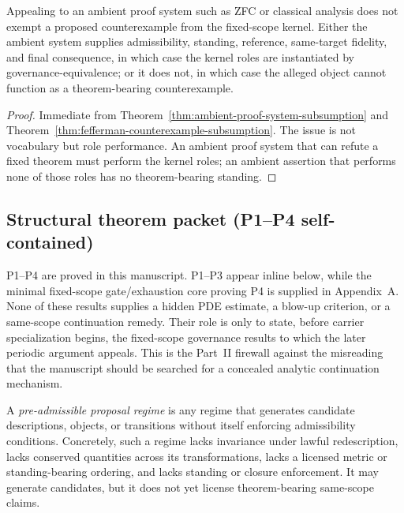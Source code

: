 \begin{manualcorollary}
\label{cor:no-ambient-proof-system-escape}
Appealing to an ambient proof system such as ZFC or classical analysis does not exempt a proposed counterexample from the fixed-scope kernel. Either the ambient system supplies admissibility, standing, reference, same-target fidelity, and final consequence, in which case the kernel roles are instantiated by governance-equivalence; or it does not, in which case the alleged object cannot function as a theorem-bearing counterexample.
\end{manualcorollary}

\begin{proof}
Immediate from Theorem~\ref{thm:ambient-proof-system-subsumption} and Theorem~\ref{thm:fefferman-counterexample-subsumption}. The issue is not vocabulary but role performance. An ambient proof system that can refute a fixed theorem must perform the kernel roles; an ambient assertion that performs none of those roles has no theorem-bearing standing.
\end{proof}

\subsection{Structural theorem packet (P1--P4 self-contained)}

\begin{tcolorbox}[title={What this packet is and is not}, colback=blue!2!white, colframe=blue!55!black]
P1--P4 are proved in this manuscript. P1--P3 appear inline below, while the minimal fixed-scope gate/exhaustion core proving P4 is supplied in Appendix~A. None of these results supplies a hidden PDE estimate, a blow-up criterion, or a same-scope continuation remedy. Their role is only to state, before carrier specialization begins, the fixed-scope governance results to which the later periodic argument appeals. This is the Part~II firewall against the misreading that the manuscript should be searched for a concealed analytic continuation mechanism.
\end{tcolorbox}

\begin{definition}\label{def:preadmissible-proposal-regime}
A \emph{pre-admissible proposal regime} is any regime that generates candidate descriptions, objects, or transitions without itself enforcing admissibility conditions. Concretely, such a regime lacks invariance under lawful redescription, lacks conserved quantities across its transformations, lacks a licensed metric or standing-bearing ordering, and lacks standing or closure enforcement. It may generate candidates, but it does not yet license theorem-bearing same-scope claims.
\end{definition}

